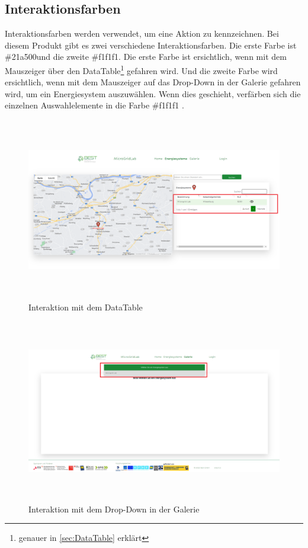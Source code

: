 \subsection{Interaktionsfarben}
Interaktionsfarben werden verwendet, um eine Aktion zu kennzeichnen. Bei diesem  Produkt gibt es zwei verschiedene Interaktionsfarben. Die erste Farbe ist \glqq\#21a500\grqq und die zweite 
\glqq\#f1f1f1\grqq. Die erste Farbe ist ersichtlich, wenn mit dem Mauszeiger über den DataTable\footnote{genauer in \autoref{sec:DataTable} erklärt} gefahren wird. Und die zweite Farbe wird ersichtlich, wenn mit dem Mauszeiger auf das Drop-Down in der Galerie gefahren wird, um ein Energiesystem auszuwählen. Wenn dies geschieht, verfärben sich die einzelnen Auswahlelemente in die Farbe \glqq \#f1f1f1 \grqq. 
\begin{figure}[h]
	\centering
	\includegraphics[height=8cm,width=15cm]{images/InteraktionDatatable}
	\caption{Interaktion mit dem DataTable}
	\label{fig: Interaktion mit dem Datatabel}
\end{figure}
\begin{figure}[h]
	\centering
	\includegraphics[height=8cm,width=15cm]{images/InteraktionDropDown}
	\caption{Interaktion mit dem Drop-Down in der Galerie}
	\label{fig: Interaktion mit dem Datatabel}
\end{figure}
\newpage


